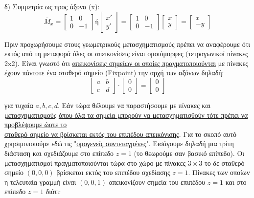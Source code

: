  δ) Συμμετρία ως προς άξονα (x):
\[
\bar{M}_x =
\begin{bmatrix} 1 & 0 \\
0 & -1 \end{bmatrix}
\text{ή}
\begin{bmatrix} x' \\ y' \end{bmatrix} =
\begin{bmatrix} 1 & 0 \\
0 & -1 \end{bmatrix}
\begin{bmatrix} x \\ y \end{bmatrix} =
\begin{bmatrix} x \\ -y \end{bmatrix}
\]

Πριν προχωρήσουμε στους γεωμετρικούς μετασχηματισμούς πρέπει να αναφέρουμε ότι εκτός από τη μεταφορά όλες οι απεικονίσεις είναι ομοιόμορφες (τετραγωνικοί πίνακες 2x2). Είναι γνωστό ότι \underline{απεικονίσεις σημείων οι οποίες πραγματοποιούνται} με πίνακες έχουν πάντοτε \underline{ένα σταθερό σημείο (Fixpoint)} την αρχή των αξόνων δηλαδή:
\[
\begin{bmatrix} a & b \\ c & d \end{bmatrix} \cdot \begin{bmatrix} 0 \\ 0 \end{bmatrix} = \begin{bmatrix} 0 \\ 0 \end{bmatrix}
\]

 για τυχαία \( a,b,c,d. \) Εάν τώρα θέλουμε να παραστήσουμε με πίνακες και \underline{μετασχηματισμούς} \underline{όπου όλα τα σημεία μπορούν να μετασχηματισθούν τότε πρέπει να προβλέψουμε ώστε το}\\ \underline{σταθερό σημείο να βρίσκεται εκτός του επιπέδου απεικόνισης}. Για το σκοπό αυτό χρησιμοποιούμε εδώ τις "\underline{ομογενείς συντεταγμένες}". Εισάγουμε δηλαδή μια τρίτη διάσταση και σχεδιάζουμε στο επίπεδο \( z=1 \) (το θεωρούμε σαν βασικό επίπεδο). Οι μετασχηματισμοί πραγματοποιούνται τώρα στο χώρο με πίνακες \( 3 \times 3 \) το δε σταθερό σημείο \( (0,0,0) \) βρίσκεται εκτός του επιπέδου σχεδίασης \( z=1 \). Πίνακες των οποίων η τελευταία γραμμή είναι \( (0,0,1) \) απεικονίζουν σημεία του επιπέδου  $z=1$ και στο επίπεδο $z=1$ διότι:

